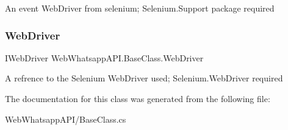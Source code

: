 An event Web\+Driver from selenium; Selenium.\+Support package required 

\mbox{\label{class_web_whatsapp_a_p_i_1_1_base_class_afc0c364092139747b980a1ad6b1e2321}} 
\subsubsection{\texorpdfstring{Web\+Driver}{WebDriver}}
{\footnotesize\ttfamily I\+Web\+Driver Web\+Whatsapp\+A\+P\+I.\+Base\+Class.\+Web\+Driver\hspace{0.3cm}{\ttfamily [get]}}



A refrence to the Selenium Web\+Driver used; Selenium.\+Web\+Driver required 



The documentation for this class was generated from the following file\+:\begin{DoxyCompactItemize}
\item 
Web\+Whatsapp\+A\+P\+I/Base\+Class.\+cs\end{DoxyCompactItemize}
